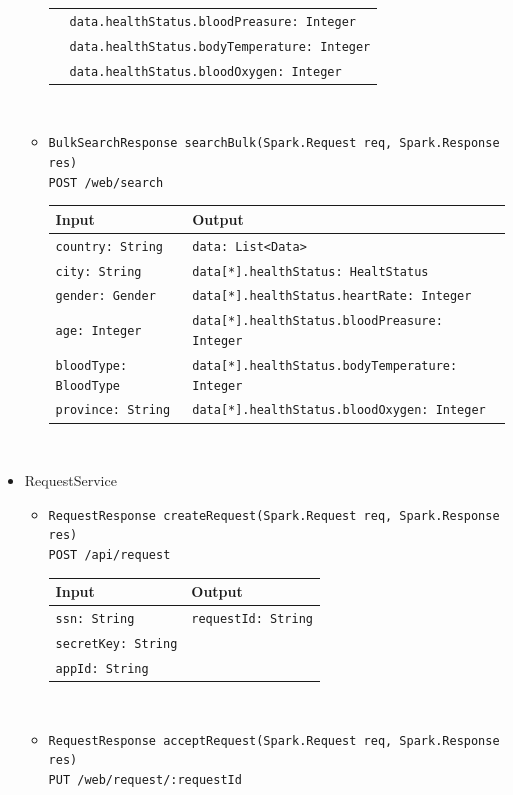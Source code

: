 \documentclass[a4paper, hidelinks, 12pt]{report}
\begin{document}
\begin{itemize}
\begin{itemize}
\begin{tabular}{l | l}
				& \verb|data.healthStatus.bloodPreasure: Integer| \\
				& \verb|data.healthStatus.bodyTemperature: Integer| \\
				& \verb|data.healthStatus.bloodOxygen: Integer| \\
			\end{tabular}\\
			\item{\verb|BulkSearchResponse searchBulk(Spark.Request req, Spark.Response res)|\\ \verb|POST /web/search|}\\
			\begin{tabular}{l | l}
			\textbf{Input} & \textbf{Output} \\
			\hline
				\verb|country: String| & \verb|data: List<Data>| \\
				\verb|city: String| & \verb|data[*].healthStatus: HealtStatus| \\
				\verb|gender: Gender| & \verb|data[*].healthStatus.heartRate: Integer| \\
				\verb|age: Integer| & \verb|data[*].healthStatus.bloodPreasure: Integer| \\
				\verb|bloodType: BloodType| & \verb|data[*].healthStatus.bodyTemperature: Integer| \\
				\verb|province: String| & \verb|data[*].healthStatus.bloodOxygen: Integer| \\
			\end{tabular}\\
		\end{itemize}
		\item{RequestService}
		\begin{itemize}
			\item{\verb|RequestResponse createRequest(Spark.Request req, Spark.Response res)|\\ \verb|POST /api/request|}\\
			\begin{tabular}{l | l}
			\textbf{Input} & \textbf{Output} \\
			\hline
				\verb|ssn: String| & \verb|requestId: String| \\
				\verb|secretKey: String| & \\
				\verb|appId: String| & \\
			\end{tabular}\\
			\item{\verb|RequestResponse acceptRequest(Spark.Request req, Spark.Response res)|\\ \verb|PUT /web/request/:requestId|}\\

\end{itemize}
\end{itemize}
\end{document}
